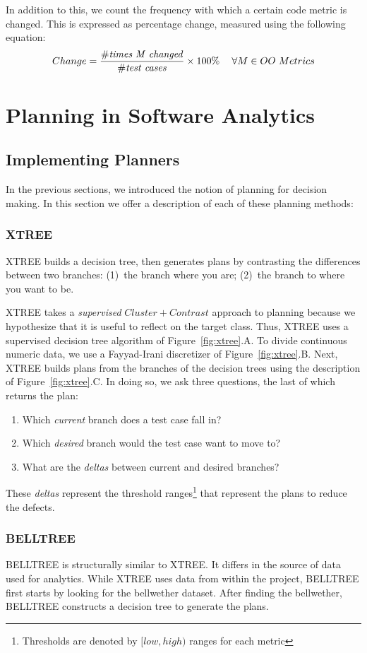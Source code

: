 \documentclass[10pt,journal,compsoc]{IEEEtran}
\newcommand{\be}{\begin{enumerate}}
\newcommand{\ee}{\end{enumerate}}
\newcommand{\fig}[1]{Figure~\ref{fig:#1}}
\begin{document}
In addition to this, we count the frequency with which a certain code metric is changed. This is expressed as percentage change, measured using the following equation:
\begin{equation}
	\label{eq:change}
	\small
	Change=\frac{\mathit{\#times\ M\ changed}}{\mathit{\#test\ cases}}\times100\%~~~~\forall M \in OO\ Metrics
\end{equation}

\section{Planning in Software Analytics}
\label{sect:motivate}
\subsection{Implementing Planners}
\label{sect:planners}
In the previous sections, we introduced the notion of planning for decision making. In this section we offer a description of each of these planning methods:

\subsubsection{XTREE}
\label{sect:XTREE}


XTREE builds a decision tree,  then generates
plans by contrasting the differences between two branches:
(1)~the branch where you are; (2)~the branch to where you want to be.

XTREE takes a {\em supervised} $Cluster+Contrast$ approach to planning because we hypothesize that it is useful to reflect on the target class. Thus, XTREE uses a supervised decision tree algorithm of \fig{xtree}.A. To divide continuous numeric data, we use a Fayyad-Irani discretizer of \fig{xtree}.B.
Next, XTREE builds plans from the branches of the decision trees using the description of \fig{xtree}.C.
In doing so, we ask three questions, the last of which returns the plan:
\be
\item
Which {\em current} branch does a test case fall in?
\item Which {\em desired} branch would the test case want to move to?
\item What are the {\em deltas} between current and desired branches? 
\ee
These \textit{deltas} represent the threshold ranges\footnote{Thresholds are denoted by $[low,high)$ ranges for each metric} that represent the plans to reduce the defects. 


\subsubsection{BELLTREE}
BELLTREE is structurally similar to XTREE. It differs in the source of data used for analytics. While XTREE uses data from within the project, BELLTREE first starts by looking for the bellwether dataset. After finding the bellwether, BELLTREE constructs a decision tree to generate the plans.
\end{document}
